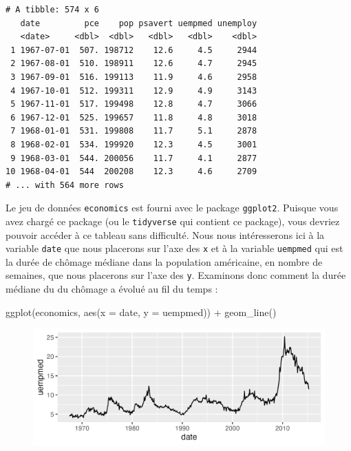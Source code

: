 \documentclass[
  letterpaper,
  DIV=11,
  numbers=noendperiod]{scrreprt}
\newenvironment{Shaded}{\begin{snugshade}}{\end{snugshade}}
\newcommand{\AttributeTok}[1]{\textcolor[rgb]{0.40,0.45,0.13}{#1}}
\newcommand{\FunctionTok}[1]{\textcolor[rgb]{0.28,0.35,0.67}{#1}}
\newcommand{\NormalTok}[1]{\textcolor[rgb]{0.00,0.23,0.31}{#1}}
\newcommand{\SpecialCharTok}[1]{\textcolor[rgb]{0.37,0.37,0.37}{#1}}
\begin{document}
\begin{verbatim}
# A tibble: 574 x 6
   date         pce    pop psavert uempmed unemploy
   <date>     <dbl>  <dbl>   <dbl>   <dbl>    <dbl>
 1 1967-07-01  507. 198712    12.6     4.5     2944
 2 1967-08-01  510. 198911    12.6     4.7     2945
 3 1967-09-01  516. 199113    11.9     4.6     2958
 4 1967-10-01  512. 199311    12.9     4.9     3143
 5 1967-11-01  517. 199498    12.8     4.7     3066
 6 1967-12-01  525. 199657    11.8     4.8     3018
 7 1968-01-01  531. 199808    11.7     5.1     2878
 8 1968-02-01  534. 199920    12.3     4.5     3001
 9 1968-03-01  544. 200056    11.7     4.1     2877
10 1968-04-01  544  200208    12.3     4.6     2709
# ... with 564 more rows
\end{verbatim}

Le jeu de données \texttt{economics} est fourni avec le package
\texttt{ggplot2}. Puisque vous avez chargé ce package (ou le
\texttt{tidyverse} qui contient ce package), vous devriez pouvoir
accéder à ce tableau sans difficulté. Nous nous intéresserons ici à la
variable \texttt{date} que nous placerons sur l'axe des \texttt{x} et à
la variable \texttt{uempmed} qui est la durée de chômage médiane dans la
population américaine, en nombre de semaines, que nous placerons sur
l'axe des \texttt{y}. Examinons donc comment la durée médiane du du
chômage a évolué au fil du temps :

\begin{Shaded}
\begin{Highlighting}[]
\FunctionTok{ggplot}\NormalTok{(economics, }\FunctionTok{aes}\NormalTok{(}\AttributeTok{x =}\NormalTok{ date, }\AttributeTok{y =}\NormalTok{ uempmed)) }\SpecialCharTok{+}
  \FunctionTok{geom\_line}\NormalTok{()}
\end{Highlighting}
\end{Shaded}

\begin{figure}[H]

{\centering \includegraphics{./03-visualization_files/figure-pdf/unnamed-chunk-51-1.png}

}

\end{figure}
\end{document}
